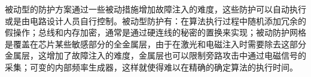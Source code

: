 \documentclass[a4paper,12pt]{article}
\begin{document}
\begin{CJK}{UTF8}{gkai}
被动型的防护方案通过一些被动措施增加故障注入的难度，这些防护可以自动执行或是由电路设计人员自行控制。被动型防护有：在算法执行过程中随机添加冗余的假操作；总线和内存加密，通常是通过硬连线的秘密的置换来实现；被动防护网格是覆盖在芯片某些敏感部分的全金属层，由于在激光和电磁注入时需要除去这部分金属层，这增加了故障注入的难度，金属层也可以限制旁路攻击中通过电磁信号的采集；可变的内部频率生成器，这样就使得难以在精确的确定算法的执行时间。
\end{CJK}
\end{document}
